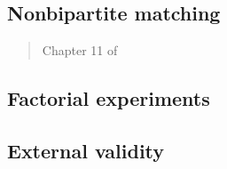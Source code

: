 \documentclass[12pt]{article}
\begin{document}
\begin{verse}  \end{verse}

\subsection{Nonbipartite matching}

\begin{verse}  \end{verse}

\begin{verse} Chapter 11 of  \end{verse}

\begin{verse}  \end{verse}

\begin{verse}  \end{verse}

\subsection{Factorial experiments}

\begin{verse}  \end{verse}

\begin{verse}  \end{verse}

\subsection{External validity}

\begin{verse}  \end{verse}

\begin{verse}  \end{verse}

\begin{verse}  \end{verse}

\begin{verse}  \end{verse}
\end{document}
